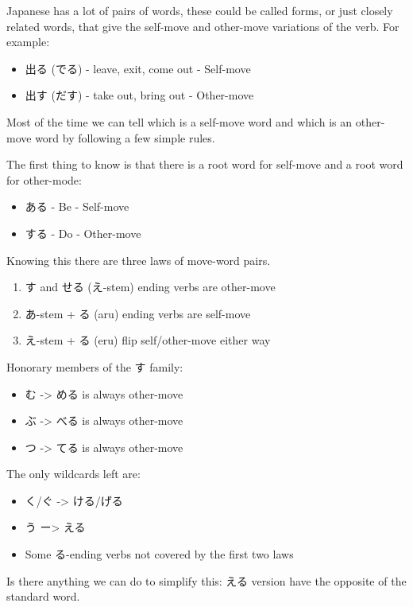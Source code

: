 \documentclass[11pt]{article}
\begin{document}
Japanese has a lot of pairs of words, these could be called forms, or just closely related words, that give the self-move and other-move variations of the verb. For example:
\begin{itemize}
\item 出る (でる) - leave, exit, come out - Self-move
\item 出す (だす) - take out, bring out - Other-move
\end{itemize}

Most of the time we can tell which is a self-move word and which is an other-move word by following a few simple rules.

The first thing to know is that there is a root word for self-move and a root word for other-mode:
\begin{itemize}
\item ある - Be - Self-move
\item する - Do - Other-move
\end{itemize}

Knowing this there are three laws of move-word pairs.
\begin{enumerate}
\item す and せる (え-stem) ending verbs are other-move
\item あ-stem + る (aru) ending verbs are self-move
\item え-stem + る (eru) flip self/other-move either way
\end{enumerate}

Honorary members of the す family:
\begin{itemize}
\item む -> める is always other-move
\item ぶ -> べる is always other-move
\item つ -> てる is always other-move
\end{itemize}

The only wildcards left are:
\begin{itemize}
\item く/ぐ -> ける/げる
\item う ー> える
\item Some る-ending verbs not covered by the first two laws
\end{itemize}

Is there anything we can do to simplify this: える version have the opposite of the standard word.
\end{document}

